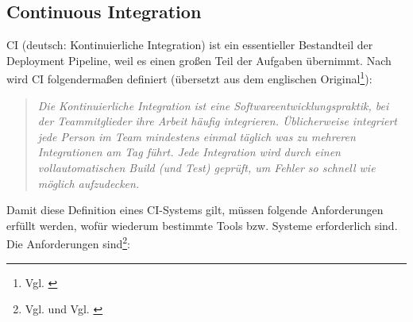 \subsection{Continuous Integration}
\acs{CI} (deutsch: Kontinuierliche Integration) ist ein essentieller Bestandteil der Deployment Pipeline, weil es einen großen Teil der Aufgaben übernimmt. Nach \cite{Fowler_CI} wird \acs{CI} folgendermaßen definiert (übersetzt aus dem englischen Original\footnote{Vgl. \cite[Seite 13f]{continuous_int}}): \begin{quote}
\frqq\textit{Die Kontinuierliche Integration ist eine Softwareentwicklungspraktik, bei der Teammitglieder ihre Arbeit häufig integrieren. Üblicherweise integriert jede Person im Team mindestens einmal täglich was zu mehreren Integrationen am Tag führt. Jede Integration wird durch einen vollautomatischen Build (und Test) geprüft, um Fehler so schnell wie möglich aufzudecken.}\flqq
\end{quote}
Damit diese Definition eines \acs{CI}-Systems gilt, müssen folgende Anforderungen erfüllt werden, wofür wiederum bestimmte Tools bzw. Systeme erforderlich sind. Die Anforderungen sind\footnote{Vgl. \cite{Fowler_CI} und Vgl. \cite[Seite 15f]{continuous_int}}: 
 
